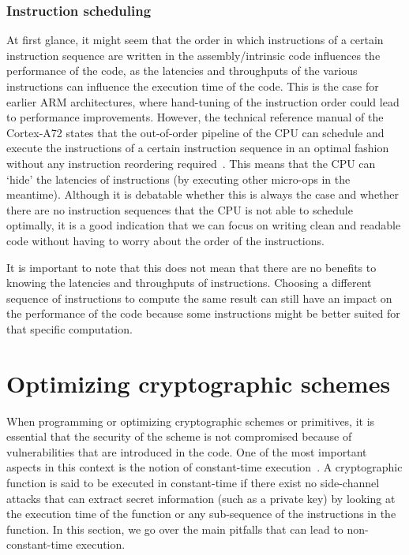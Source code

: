 \documentclass[11pt,a4paper]{report}
\theoremstyle{definition}
\begin{document}
\subsubsection{Instruction scheduling}
At first glance, it might seem that the order in which instructions of a certain instruction sequence are written in the assembly/intrinsic code influences the performance of the code, as the latencies and throughputs of the various instructions can influence the execution time of the code. This is the case for earlier ARM architectures, where hand-tuning of the instruction order could lead to performance improvements. However, the technical reference manual of the Cortex-A72 states that the out-of-order pipeline of the CPU can schedule and execute the instructions of a certain instruction sequence in an optimal fashion without any instruction reordering required~\cite{ARM_Cortex_A72_TRM}. This means that the CPU can `hide' the latencies of instructions (by executing other micro-ops in the meantime). Although it is debatable whether this is always the case and whether there are no instruction sequences that the CPU is not able to schedule optimally, it is a good indication that we can focus on writing clean and readable code without having to worry about the order of the instructions.

It is important to note that this does not mean that there are no benefits to knowing the latencies and throughputs of instructions. Choosing a different sequence of instructions to compute the same result can still have an impact on the performance of the code because some instructions might be better suited for that specific computation.

\section{Optimizing cryptographic schemes}
\label{sec:optimizingcrypto}
When programming or optimizing cryptographic schemes or primitives, it is essential that the security of the scheme is not compromised because of vulnerabilities that are introduced in the code. One of the most important aspects in this context is the notion of constant-time execution~\cite{kocher1996timing}. A cryptographic function is said to be executed in constant-time if there exist no side-channel attacks that can extract secret information (such as a private key) by looking at the execution time of the function or any sub-sequence of the instructions in the function. In this section, we go over the main pitfalls that can lead to non-constant-time execution.
\end{document}
